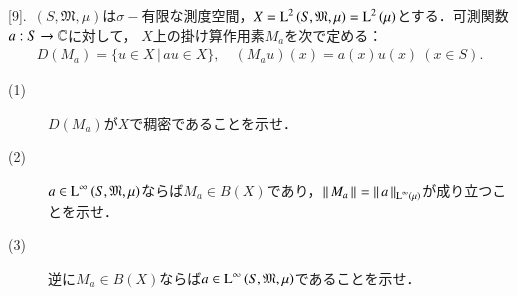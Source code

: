 \begin{comment}
		と表せば$T^*$は$B(X)$の元であり，部分和を$T_N \coloneqq \sum_{n=0}^{N} T^n\ (N = 0,1,2,\cdots)$と表現して
		$\Norm{T_N - T^*}{} \rightarrow 0\ (N \rightarrow +\infty)$が成り立っていることになる．任意の$u \in X$に対して
		\begin{align}
			\Norm{(TT^* - TT_N)u}{X} = \Norm{TT^*u - TT_Nu}{X} = \Norm{T(T^*u) - T(T_Nu)}{X} = \Norm{T(T^*u - T_Nu)}{X} = \Norm{T(T^* - T_N)u}{X}
		\end{align}
		と
		\begin{align}
			\Norm{(T^*T - T_NT)u}{X} = \Norm{T^*Tu - T_NTu}{X} = \Norm{T^*(Tu) - T_N(Tu)}{X} = \Norm{(T^*-T_N)Tu}{X}
		\end{align}
		が成り立つことから，
		\begin{align}
			\Norm{TT^* - TT_N}{} \leq \Norm{T}{}\Norm{T^* - T_N}{} \longrightarrow 0\ (N \longrightarrow +\infty) \label{eq:func_analy_conv1}
		\end{align}
		と
		\begin{align}
			\Norm{T^*T - T_NT}{} \leq \Norm{T^* - T_N}{}\Norm{T}{} \longrightarrow 0\ (N \longrightarrow +\infty) \label{eq:func_analy_conv2}
		\end{align}
		が成り立つ．(\refeq{eq:func_analy_conv1})により
		\begin{align}
			TT^* = \lim_{N \to \infty} TT_N = \lim_{N \to \infty} \sum_{n=1}^{N+1} T^n = \sum_{n=1}^{+\infty} T^n = T^* - I
		\end{align}
		が成り立つから$I = T^* - TT^* = (I - T)T^*$と表現でき，また(\refeq{eq:func_analy_conv2})により
		\begin{align}
			T^*T = \lim_{N \to \infty} T_NT = \lim_{N \to \infty} \sum_{n=1}^{N+1} T^n = \sum_{n=1}^{+\infty} T^n = T^* - I
		\end{align}
		も成り立つから$I = T^* - T^*T = T^*(I - T)$と表現できる．ゆえに$I = (I - T)T^* = T^*(I - T)$が成り立ち，この等式は
		$I-T$が$X \longmapsto X$の全単射であり$T^* \in B(X)$を逆写像にもつことを示している．
		\QED
\end{description}
\end{prf}
\end{comment}

[9].\ $(S, \mathfrak{M}, \mu)$は$\sigma-$有限な測度空間，$X=\operatorname{L}^{2} \left(S, \mathfrak{M}, \mu\right)=\operatorname{L}^{2} \left(\mu\right)$とする．可測関数$a:S \rightarrow \mathbb{C}$に対して，
$X$上の掛け算作用素$M_a$を次で定める：
\begin{align}
	D(M_a) = \{u \in X\, |\, au \in X\}, \quad (M_au)(x) = a(x)u(x)\ (x \in S).
\end{align}
\begin{description}
	\item[(1)] $D(M_a)$が$X$で稠密であることを示せ．
	\item[(2)] $a \in \operatorname{L}^{\infty} \left(S, \mathfrak{M}, \mu\right)$ならば$M_a \in B(X)$であり，$\left\|\, M_a\, \right\|_{} = \left\|\, a\, \right\|_{\operatorname{L}^{\infty} \left(\mu\right)}$が成り立つことを示せ．
	\item[(3)] 逆に$M_a \in B(X)$ならば$a \in \operatorname{L}^{\infty} \left(S, \mathfrak{M}, \mu\right)$であることを示せ．
\end{description}


